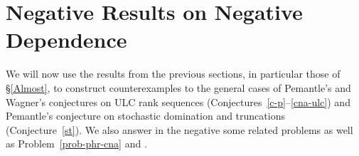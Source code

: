 \documentclass[10pt,reqno]{amsart}
\theoremstyle{plain}
\theoremstyle{definition}
\theoremstyle{remark}
\begin{document}

\section{Negative Results on Negative Dependence}\label{s-countex}

We will now use the results from the previous 
sections, in particular those of \S \ref{Almost}, to construct
counterexamples to the general cases of Pemantle's and Wagner's conjectures
on ULC rank sequences (Conjectures~\ref{c-p}--\ref{cna-ulc}) and   
Pemantle's conjecture
on stochastic domination and truncations 
(Conjecture~\ref{st}). We also answer in the negative  
some related problems as well as Problem~\ref{prob-phr-cna} and 
\cite[Problem 6]{BBCV}.
 
\end{document}
